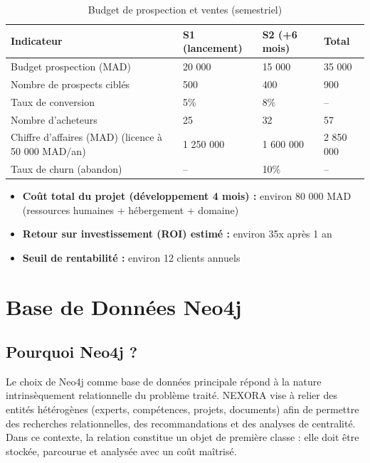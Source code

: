 \documentclass[12pt,a4paper]{report}
\begin{document}
\begin{table}[H]
\centering
\caption{Budget de prospection et ventes (semestriel)}
\label{tab:financier}
\begin{tabular}{p{5cm} p{3cm} p{3cm} p{3cm}}
\toprule
\textbf{Indicateur} & \textbf{S1 (lancement)} & \textbf{S2 (+6 mois)} & \textbf{Total} \\
\midrule
Budget prospection (MAD) & 20 000 & 15 000 & 35 000 \\
Nombre de prospects ciblés & 500 & 400 & 900 \\
Taux de conversion & 5\% & 8\% & -- \\
Nombre d'acheteurs & 25 & 32 & 57 \\
Chiffre d'affaires (MAD) (licence à 50 000 MAD/an) & 1 250 000 & 1 600 000 & 2 850 000 \\
Taux de churn (abandon) & -- & 10\% & -- \\
\bottomrule
\end{tabular}
\end{table}

\begin{itemize}
  \item \textbf{Coût total du projet (développement 4 mois) :} environ 80 000 MAD (ressources humaines + hébergement + domaine)
  \item \textbf{Retour sur investissement (ROI) estimé :} environ 35x après 1 an
  \item \textbf{Seuil de rentabilité :} environ 12 clients annuels
\end{itemize}

\newpage
\chapter{Base de Données Neo4j}

\section{Pourquoi Neo4j ?}
Le choix de Neo4j comme base de données principale répond à la nature intrinsèquement relationnelle du problème traité. NEXORA vise à relier des entités hétérogènes (experts, compétences, projets, documents) afin de permettre des recherches relationnelles, des recommandations et des analyses de centralité. Dans ce contexte, la relation constitue un objet de première classe : elle doit être stockée, parcourue et analysée avec un coût maîtrisé.
\end{document}
